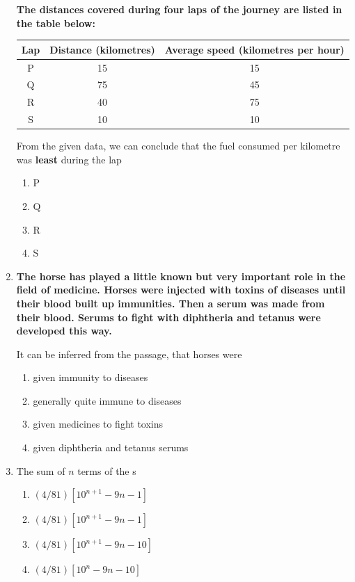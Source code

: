\documentclass[journal]{IEEEtran}
\numberwithin{equation}{enumi}
\numberwithin{figure}{enumi}
\begin{document}
\begin{enumerate}
\noindent
\textbf{The distances covered during four laps of the journey are listed in the table below:}

\vspace{0.5em}
\begin{center}
\begin{tabular}{|c|c|c|}
\hline
\textbf{Lap} & \textbf{Distance (kilometres)} & \textbf{Average speed (kilometres per hour)} \\
\hline
P & 15 & 15 \\
Q & 75 & 45 \\
R & 40 & 75 \\
S & 10 & 10 \\
\hline
\end{tabular}
\end{center}

From the given data, we can conclude that the fuel consumed per kilometre was \textbf{least} during the lap 

\begin{multicols}{4}
\begin{enumerate}
   \item P
   \item Q
   \item R
    \item S
\end{enumerate}
\end{multicols}


\item \textbf{The horse has played a little known but very important role in the field of medicine. Horses were injected with toxins of diseases until their blood built up immunities. Then a serum was made from their blood. Serums to fight with diphtheria and tetanus were developed this way.}

It can be inferred from the passage, that horses were
\hfill{}

\begin{enumerate}
    
    \item given immunity to diseases
    \item generally quite immune to diseases
    \item given medicines to fight toxins
    \item given diphtheria and tetanus serums
\end{enumerate}

\newpage

\item  The sum of $n$ terms of the s
\hfill{}
\begin{enumerate}
    \item $(4/81) [10^{n+1} - 9n - 1]$
    \item $(4/81) [10^{n+1} - 9n - 1]$
    \item $(4/81) [10^{n+1} - 9n - 10]$
    \item $(4/81) [10^{n} - 9n - 10]$
\end{enumerate}


\end{enumerate}
\end{document}
